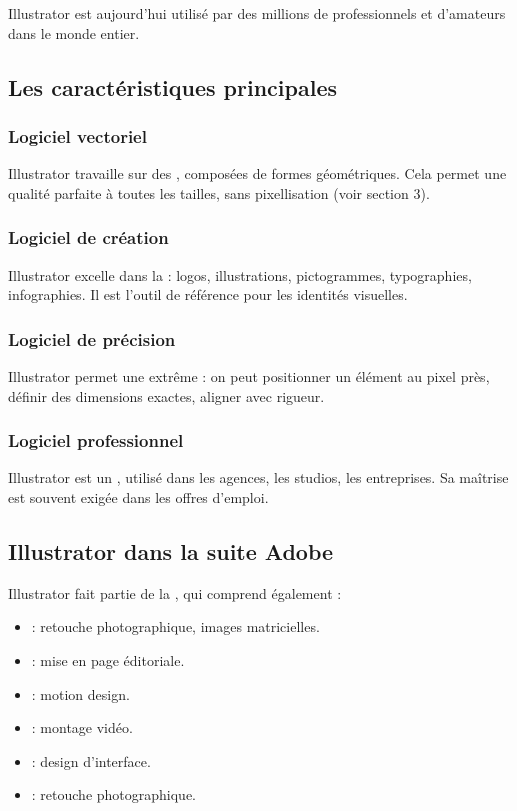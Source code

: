 Illustrator est aujourd'hui utilisé par des millions de professionnels et d'amateurs dans le monde entier.

\subsection{Les caractéristiques principales}

\subsubsection{Logiciel vectoriel}

Illustrator travaille sur des , composées de formes géométriques. Cela permet une qualité parfaite à toutes les tailles, sans pixellisation (voir section 3).

\subsubsection{Logiciel de création}

Illustrator excelle dans la  : logos, illustrations, pictogrammes, typographies, infographies. Il est l'outil de référence pour les identités visuelles.

\subsubsection{Logiciel de précision}

Illustrator permet une  extrême : on peut positionner un élément au pixel près, définir des dimensions exactes, aligner avec rigueur.

\subsubsection{Logiciel professionnel}

Illustrator est un , utilisé dans les agences, les studios, les entreprises. Sa maîtrise est souvent exigée dans les offres d'emploi.

\subsection{Illustrator dans la suite Adobe}

Illustrator fait partie de la , qui comprend également :

\begin{itemize}
    \item {} : retouche photographique, images matricielles.
    \item {} : mise en page éditoriale.
    \item {} : motion design.
    \item {} : montage vidéo.
    \item {} : design d'interface.
    \item {} : retouche photographique.
\end{itemize}

